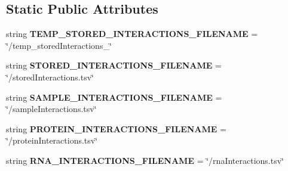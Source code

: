 \subsection*{Static Public Attributes}
\begin{DoxyCompactItemize}
\item 
\hypertarget{classsrc_1_1fr_1_1tagc_1_1rainet_1_1core_1_1execution_1_1processing_1_1catrapid_1_1ReadCatrapid_1_1ReadCatrapid_ac537b9cddb385368605c6beef013184d}{string {\bfseries T\-E\-M\-P\-\_\-\-S\-T\-O\-R\-E\-D\-\_\-\-I\-N\-T\-E\-R\-A\-C\-T\-I\-O\-N\-S\-\_\-\-F\-I\-L\-E\-N\-A\-M\-E} = \char`\"{}/temp\-\_\-stored\-Interactions\-\_\-\char`\"{}}\label{classsrc_1_1fr_1_1tagc_1_1rainet_1_1core_1_1execution_1_1processing_1_1catrapid_1_1ReadCatrapid_1_1ReadCatrapid_ac537b9cddb385368605c6beef013184d}

\item 
\hypertarget{classsrc_1_1fr_1_1tagc_1_1rainet_1_1core_1_1execution_1_1processing_1_1catrapid_1_1ReadCatrapid_1_1ReadCatrapid_a1eddf27dbc8890fdd70da5f2b5a98777}{string {\bfseries S\-T\-O\-R\-E\-D\-\_\-\-I\-N\-T\-E\-R\-A\-C\-T\-I\-O\-N\-S\-\_\-\-F\-I\-L\-E\-N\-A\-M\-E} = \char`\"{}/stored\-Interactions.\-tsv\char`\"{}}\label{classsrc_1_1fr_1_1tagc_1_1rainet_1_1core_1_1execution_1_1processing_1_1catrapid_1_1ReadCatrapid_1_1ReadCatrapid_a1eddf27dbc8890fdd70da5f2b5a98777}

\item 
\hypertarget{classsrc_1_1fr_1_1tagc_1_1rainet_1_1core_1_1execution_1_1processing_1_1catrapid_1_1ReadCatrapid_1_1ReadCatrapid_a1a65d2fca492b62806643165a4a73580}{string {\bfseries S\-A\-M\-P\-L\-E\-\_\-\-I\-N\-T\-E\-R\-A\-C\-T\-I\-O\-N\-S\-\_\-\-F\-I\-L\-E\-N\-A\-M\-E} = \char`\"{}/sample\-Interactions.\-tsv\char`\"{}}\label{classsrc_1_1fr_1_1tagc_1_1rainet_1_1core_1_1execution_1_1processing_1_1catrapid_1_1ReadCatrapid_1_1ReadCatrapid_a1a65d2fca492b62806643165a4a73580}

\item 
\hypertarget{classsrc_1_1fr_1_1tagc_1_1rainet_1_1core_1_1execution_1_1processing_1_1catrapid_1_1ReadCatrapid_1_1ReadCatrapid_ac3f4b545524ccc8919380cf2a6ffdc16}{string {\bfseries P\-R\-O\-T\-E\-I\-N\-\_\-\-I\-N\-T\-E\-R\-A\-C\-T\-I\-O\-N\-S\-\_\-\-F\-I\-L\-E\-N\-A\-M\-E} = \char`\"{}/protein\-Interactions.\-tsv\char`\"{}}\label{classsrc_1_1fr_1_1tagc_1_1rainet_1_1core_1_1execution_1_1processing_1_1catrapid_1_1ReadCatrapid_1_1ReadCatrapid_ac3f4b545524ccc8919380cf2a6ffdc16}

\item 
\hypertarget{classsrc_1_1fr_1_1tagc_1_1rainet_1_1core_1_1execution_1_1processing_1_1catrapid_1_1ReadCatrapid_1_1ReadCatrapid_ac10ebee364725ebe9f7c05a2bc4d78c4}{string {\bfseries R\-N\-A\-\_\-\-I\-N\-T\-E\-R\-A\-C\-T\-I\-O\-N\-S\-\_\-\-F\-I\-L\-E\-N\-A\-M\-E} = \char`\"{}/rna\-Interactions.\-tsv\char`\"{}}\label{classsrc_1_1fr_1_1tagc_1_1rainet_1_1core_1_1execution_1_1processing_1_1catrapid_1_1ReadCatrapid_1_1ReadCatrapid_ac10ebee364725ebe9f7c05a2bc4d78c4}


\end{DoxyCompactItemize}
